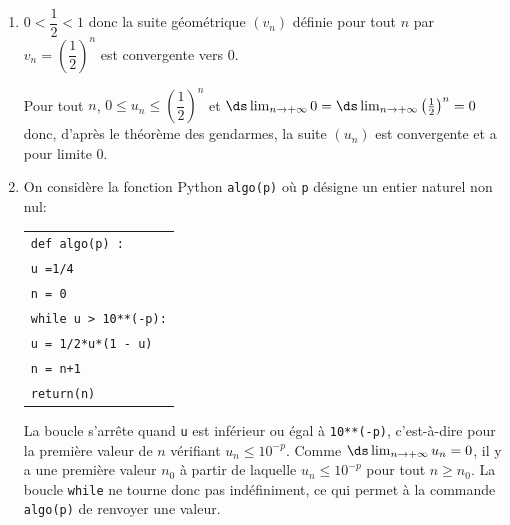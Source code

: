 \begin{enumerate}
\item %
$0<\dfrac{1}{2}<1$ donc la suite géométrique $(v_n)$ définie pour tout $n$ par $v_n=\left (\dfrac{1}{2} \right )^n$ est convergente vers 0.

Pour tout $n$, $ 0 \leqslant u_n \leqslant \left(\dfrac12\right)^n$ et $\ds\lim_{n\to +\infty} 0 = \ds\lim_{n\to +\infty} \left (\frac{1}{2}\right )^n=0$ donc, d'après le théorème des gendarmes, la suite $(u_n)$ est convergente et a pour limite 0.

\item On considère la fonction Python \texttt{algo(p)} où \texttt{p} désigne un entier naturel non nul:

\begin{center}
\begin{tabular}{|l|}\hline
\texttt{def algo(p) :}\\
\quad  \texttt{u =1/4}\\
\quad \texttt{n = 0}\\
\quad \texttt{while u > 10**(-p):}\\
\quad \qquad \texttt{u = 1/2*u*(1 - u)}\\
\quad \qquad \texttt{n = n+1}\\
\quad \texttt{return(n)}\\ \hline
\end{tabular}
\end{center}

La boucle s'arrête quand \texttt{u} est inférieur ou égal à \texttt{10**(-p)}, c'est-à-dire pour la première valeur de $n$ vérifiant $u_n \leqslant 10^{-p}$.
Comme $\ds\lim_{n\to +\infty} u_n=0$, il y a une première valeur $n_0$ à partir de laquelle $u_n \leqslant 10^{-p}$ pour tout $n\geqslant n_0$.
La boucle \texttt{while} ne tourne donc pas indéfiniment, ce qui permet à la commande \texttt{algo(p)} de renvoyer une valeur.
\end{enumerate}

\bigskip

